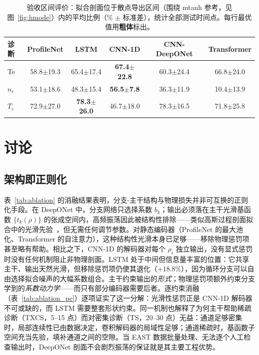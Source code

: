 \documentclass[a4paper,12pt]{ctexart}
\begin{document}
\begin{table}[htbp]
\centering\footnotesize
\caption{验收区间评价：拟合剖面位于散点导出区间（围绕 mtanh 参考，见图~\ref{fig:hmode}）内的平均比例（\% $\pm$ 标准差），统计全部测试时间点。每行最优值用\textbf{粗体}标出。}
\label{tab:band}
\begin{tabular}{l c c c c c}
\toprule
\textbf{诊断} & \textbf{ProfileNet} & \textbf{LSTM} & \textbf{CNN-1D} & \textbf{CNN-DeepONet} & \textbf{Transformer} \\
\midrule
Te & 58.8$\pm$19.3 & 65.4$\pm$17.4 & \textbf{67.4$\pm$22.8} & 60.3$\pm$24.4 & 66.8$\pm$24.0 \\
$n_e$ & 53.1$\pm$18.6 & 48.3$\pm$15.4 & \textbf{56.5$\pm$7.8} & 36.3$\pm$11.9 & 10.4$\pm$13.9 \\
$T_i$ & 72.9$\pm$27.0 & \textbf{78.3$\pm$26.0} & 46.7$\pm$18.0 & 78.3$\pm$16.5 & 71.8$\pm$25.8 \\
\bottomrule
\end{tabular}
\end{table}

\section{讨论}

\subsection{架构即正则化}

表~\ref{tab:ablation} 的消融结果表明，分支-主干结构与物理损失并非可互换的正则化手段。在 DeepONet 中，分支网络只选择系数 $b_k$；输出必须落在主干光滑基函数 $\{t_k(\rho)\}$ 的张成空间内，高频振荡因此被结构性排除——类似高斯过程剖面拟合中的光滑先验~\cite{gpr_profiles,gpr_review}，但无需任何调节参数。对静态编码器（ProfileNet 的最大池化、Transformer 的自注意力），这种结构性光滑本身已足够——移除物理惩罚项甚至略有帮助。相比之下，CNN-1D 的解码器对每个 $\rho_i$ 独立输出，没有显式惩罚时没有任何机制阻止非物理剖面。LSTM 处于中间但信息量丰富的位置：它共享主干、输出天然光滑，但移除惩罚项仍使其退化（$+18.8\%$），因为循环分支可以自由选择拟合噪声的大幅系数组合。主干约束输出的\textit{形式}；物理惩罚项额外约束分支学到的\textit{系数动力学}——而只有部分编码器需要后者。逐约束消融（表~\ref{tab:ablation_pc}）逐项证实了这一分解：光滑性惩罚正是 CNN-1D 解码器不可或缺的，而 LSTM 需要整套形状约束。同一机制也解释了为何主干帮助稀疏诊断（TXCS，5--15 点）而对密集诊断（TS，20--30 点）无益：通道足够密集时，局部连续性已由数据决定，卷积解码器的局域性足够；通道稀疏时，基函数子空间充当先验，填补通道之间的空隙。当 EAST 数据批量处理、无法逐个人工检查输出时，DeepONet 剖面不会剧烈振荡的保证就是其主要工程优势。
\end{document}
